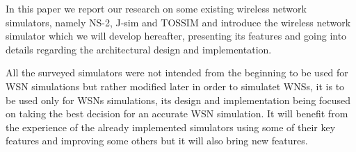 In this paper we report our research on some existing wireless network
simulators, namely NS-2, J-sim and TOSSIM and introduce \codename the 
wireless network simulator which we will develop hereafter, presenting its 
features and going into details regarding the architectural design and implementation.

All the surveyed simulators were not intended from the beginning to be
used for WSN simulations but rather modified later in order to simulatet WNSs, 
\codename it is to be used only 
for WSNs simulations, its design and
implementation being focused on taking the best decision for an accurate WSN
simulation. It will benefit from the experience of the already implemented
simulators using some of their key features and improving some others but
it will also bring new features.

